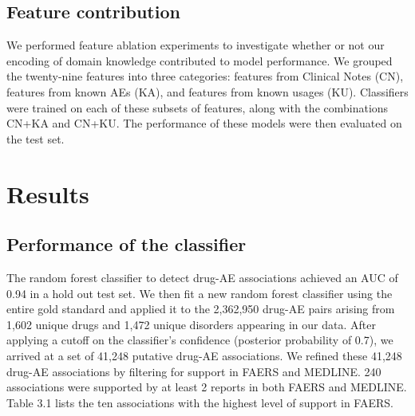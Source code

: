 \subsection{Feature contribution}
We performed feature ablation experiments to investigate whether or
not our encoding of domain knowledge contributed to model
performance.  We grouped the twenty-nine features into
three categories: features from Clinical Notes (CN), features from
known AEs (KA), and features from known usages (KU).  Classifiers were
trained on each of these subsets of features, along with the
combinations CN+KA and CN+KU.  The performance of these models were
then evaluated on the test set. 

\section{Results}
\subsection{Performance of the classifier}
The random forest classifier to detect drug-AE associations achieved
an AUC of 0.94 in a hold out test set. We then fit a new random forest
classifier using the entire gold standard and applied it to the
2,362,950 drug-AE pairs arising from 1,602 unique drugs and 1,472
unique disorders appearing in our data. After applying a cutoff on the
classifier’s confidence (posterior probability of 0.7), we arrived at
a set of 41,248 putative drug-AE associations. We refined these 41,248
drug-AE associations by filtering for support in FAERS and
MEDLINE. 240 associations were supported by at least 2 reports in both
FAERS and MEDLINE. Table 3.1 lists the ten associations with the
highest level of support in FAERS.

